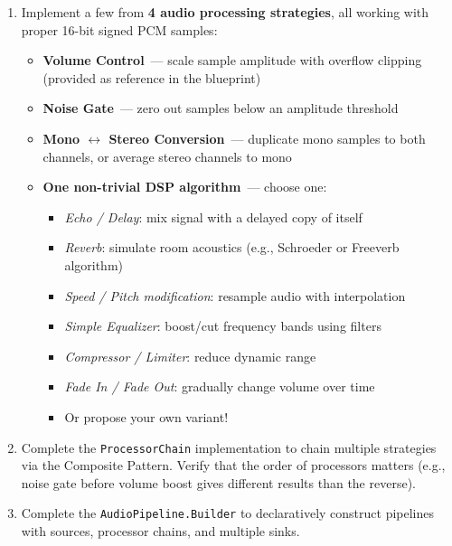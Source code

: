 \documentclass[a4paper,12pt]{article}
\begin{document}
\begin{enumerate}
    \item Implement a few from \textbf{4 audio processing strategies},
          all working with proper 16-bit signed PCM samples:
    \begin{itemize}
        \item \textbf{Volume Control}~--- scale sample amplitude with overflow clipping
              (provided as reference in the blueprint)
        \item \textbf{Noise Gate}~--- zero out samples below an amplitude threshold
        \item \textbf{Mono $\leftrightarrow$ Stereo Conversion}~--- duplicate mono samples to both channels,
              or average stereo channels to mono
        \item \textbf{One non-trivial DSP algorithm}~--- choose one:
        \begin{itemize}
            \item \textit{Echo / Delay}: mix signal with a delayed copy of itself
            \item \textit{Reverb}: simulate room acoustics (e.g., Schroeder or Freeverb algorithm)
            \item \textit{Speed / Pitch modification}: resample audio with interpolation
            \item \textit{Simple Equalizer}: boost/cut frequency bands using filters
            \item \textit{Compressor / Limiter}: reduce dynamic range
            \item \textit{Fade In / Fade Out}: gradually change volume over time
            \item Or propose your own variant!
        \end{itemize}
    \end{itemize}

    \item Complete the \texttt{ProcessorChain} implementation to chain multiple strategies
          via the Composite Pattern. Verify that the order of processors matters
          (e.g., noise gate before volume boost gives different results than the reverse).

    \item Complete the \texttt{AudioPipeline.Builder} to declaratively construct pipelines
          with sources, processor chains, and multiple sinks.
\end{enumerate}

\end{document}
